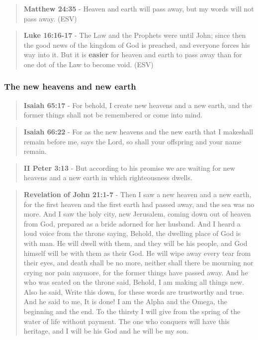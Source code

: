 \documentclass[11pt]{article}
\begin{document}
\begin{quote}
\textbf{Matthew 24:35} - Heaven and earth will pass away, but my words will not pass away. (ESV)
\end{quote}

\begin{quote}
\textbf{Luke 16:16-17} -  The Law and the Prophets were until John; since then the good news of the kingdom of God is preached, and everyone forces his way into it.  But it is \textbf{easier} for heaven and earth to pass away than for one dot of the Law to become void. (ESV)
\end{quote}

\subsubsection{The new heavens and new earth}
\label{sec:orga36b833}
\begin{quote}
\textbf{Isaiah 65:17} - For behold, I create new heavens and a new earth, and the former things shall not be remembered or come into mind.
\end{quote}

\begin{quote}
\textbf{Isaiah 66:22} - For as the new heavens and the new earth that I makeshall remain before me, says the Lord, so shall your offspring and your name remain.
\end{quote}

\begin{quote}
\textbf{II Peter 3:13} - But according to his promise we are waiting for new heavens and a new earth in which righteousness dwells.
\end{quote}

\begin{quote}
\textbf{Revelation of John 21:1-7} - Then I saw a new heaven and a new earth, for the first heaven and the first earth had passed away, and the sea was no more. And I saw the holy city, new Jerusalem, coming down out of heaven from God, prepared as a bride adorned for her husband. And I heard a loud voice from the throne saying, Behold, the dwelling place of God is with man. He will dwell with them, and they will be his people, and God himself will be with them as their God. He will wipe away every tear from their eyes, and death shall be no more, neither shall there be mourning nor crying nor pain anymore, for the former things have passed away. And he who was seated on the throne said, Behold, I am making all things new. Also he said, Write this down, for these words are trustworthy and true. And he said to me, It is done! I am the Alpha and the Omega, the beginning and the end. To the thirsty I will give from the spring of the water of life without payment. The one who conquers will have this heritage, and I will be his God and he will be my son.
\end{quote}
\end{document}
